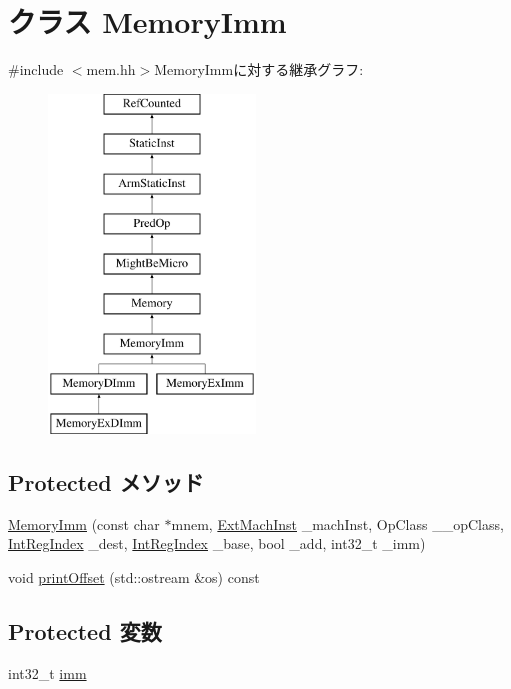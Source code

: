 \hypertarget{classArmISA_1_1MemoryImm}{
\section{クラス MemoryImm}
\label{classArmISA_1_1MemoryImm}
}


{\ttfamily \#include $<$mem.hh$>$}MemoryImmに対する継承グラフ:\begin{figure}[H]
\begin{center}
\leavevmode
\includegraphics[height=9cm]{classArmISA_1_1MemoryImm}
\end{center}
\end{figure}
\subsection*{Protected メソッド}
\begin{DoxyCompactItemize}
\item 
\hyperlink{classArmISA_1_1MemoryImm_ae3e22d0db45880b32302c4be4b7f93dd}{MemoryImm} (const char $\ast$mnem, \hyperlink{classStaticInst_a5605d4fc727eae9e595325c90c0ec108}{ExtMachInst} \_\-machInst, OpClass \_\-\_\-opClass, \hyperlink{namespaceArmISA_ae64680ba9fb526106829d6bf92fc791b}{IntRegIndex} \_\-dest, \hyperlink{namespaceArmISA_ae64680ba9fb526106829d6bf92fc791b}{IntRegIndex} \_\-base, bool \_\-add, int32\_\-t \_\-imm)
\item 
void \hyperlink{classArmISA_1_1MemoryImm_a7fdadf47668a31b2e7b99f0cc36c5d4f}{printOffset} (std::ostream \&os) const 
\end{DoxyCompactItemize}
\subsection*{Protected 変数}
\begin{DoxyCompactItemize}
\item 
int32\_\-t \hyperlink{classArmISA_1_1MemoryImm_a71f011dbd3228d41f9e08aaf8c133f77}{imm}
\end{DoxyCompactItemize}


